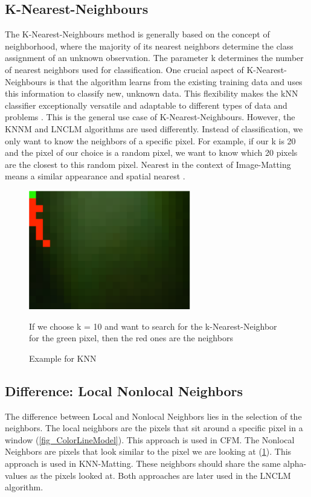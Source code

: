 \subsection{K-Nearest-Neighbours}
The K-Nearest-Neighbours method is generally based on the concept of neighborhood, where the majority of its nearest neighbors determine the class assignment of an unknown observation. The parameter k determines the number of nearest neighbors used for classification. One crucial aspect of K-Nearest-Neighbours is that the algorithm learns from the existing training data and uses this information to classify new, unknown data. This flexibility makes the kNN classifier exceptionally versatile and adaptable to different types of data and problems \citep{knearestneighbour}. 
This is the general use case of K-Nearest-Neighbours. However, the KNNM and LNCLM algorithms are used differently. Instead of classification, we only want to know the neighbors of a specific pixel. For example, if our k is 20 and the pixel of our choice is a random pixel, we want to know which 20 pixels are the closest to this random pixel. Nearest in the context of Image-Matting means a similar appearance and spatial nearest \citep{lnclm}.

\begin{figure}[htb]
	\begin{center}
		\includegraphics[width=200pt]{bilder/knn}
		\caption{Example for KNN}\label{fig_knn}
		\medskip
		\small{If we choose k = 10 and want to search for the k-Nearest-Neighbor for the green pixel, then the red ones are the neighbors}
	\end{center}
\end{figure}



\subsection{Difference: Local Nonlocal Neighbors}
The difference between Local and Nonlocal Neighbors lies in the selection of the neighbors. The local neighbors are the pixels that sit around a specific pixel in a window (\ref{fig_ColorLineModel}). This approach is used in CFM.
The Nonlocal Neighbors are pixels that look similar to the pixel we are looking at (\ref{fig_knn}). This approach is used in KNN-Matting.
These neighbors should share the same alpha-values as the pixels looked at. Both approaches are later used in the LNCLM algorithm. \cite{lnclm}


